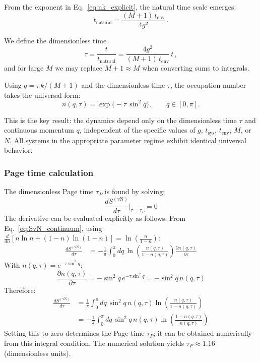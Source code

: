\documentclass[12pt,oneside,openright]{report}
\theoremstyle{definition}
\theoremstyle{plain}
\theoremstyle{remark}
\begin{document}
From the exponent in Eq.~\eqref{eq:nk_explicit}, the natural time scale emerges:
\begin{equation}
t_{\text{natural}} = \frac{(M+1)\, t_{\mathrm{env}}}{4 g^2}\,.
\end{equation}

We define the dimensionless time
\begin{equation}
  	\tau = \frac{t}{t_{\text{natural}}} = \frac{4 g^2}{(M+1)\, t_{\mathrm{env}}}\, t\,,
\label{eq:tau_def}
\end{equation}
and for large $M$ we may replace $M+1 \approx M$ when converting sums to integrals.

Using $q = \pi k/(M+1)$ and the dimensionless time $\tau$, the occupation number takes the universal form:
\begin{equation}
n(q,\tau) = \exp\!\big(-\tau \, \sin^2 q\big), \qquad q\in[0,\pi].
\label{eq:nq_tau}
\end{equation}

This is the key result: the dynamics depend only on the dimensionless time $\tau$ and continuous momentum $q$, independent of the specific values of $g$, $t_{\text{sys}}$, $t_{\text{env}}$, $M$, or $N$. All systems in the appropriate parameter regime exhibit identical universal behavior.

\subsubsection{Page time calculation}
The dimensionless Page time $\tau_P$ is found by solving:
\begin{equation}
\frac{dS^{(\text{vN})}}{d\tau}\bigg|_{\tau=\tau_P} = 0
\end{equation}
The derivative can be evaluated explicitly as follows.
From Eq.~\eqref{eq:SvN_continuum}, using $\frac{d}{dn}[n\ln n + (1-n)\ln(1-n)] = \ln\left(\frac{n}{1-n}\right)$:
\begin{align}
\frac{dS^{(\text{vN})}}{d\tau} &= -\frac{1}{\pi} \int_0^{\pi} dq \, \ln\left(\frac{n(q,\tau)}{1-n(q,\tau)}\right) \frac{\partial n(q,\tau)}{\partial\tau}
\end{align}
With $n(q,\tau) = e^{-\tau \sin^2 q}$:
\begin{equation}
\frac{\partial n(q,\tau)}{\partial\tau} = -\sin^2 q\, e^{-\tau \sin^2 q} = -\sin^2 q\, n(q,\tau)
\end{equation}
Therefore:
\begin{align}
\frac{dS^{(\text{vN})}}{d\tau} &= \frac{1}{\pi} \int_0^{\pi} dq \, \sin^2 q\, n(q,\tau) \ln\left(\frac{n(q,\tau)}{1-n(q,\tau)}\right) \nonumber \\
&= -\frac{1}{\pi} \int_0^{\pi} dq \, \sin^2 q\, n(q,\tau) \ln\left(\frac{1-n(q,\tau)}{n(q,\tau)}\right)
\end{align}
Setting this to zero determines the Page time $\tau_P$; it can be obtained numerically from this integral condition. The numerical solution yields $\tau_P \approx 1.16$ (dimensionless units).
\end{document}
